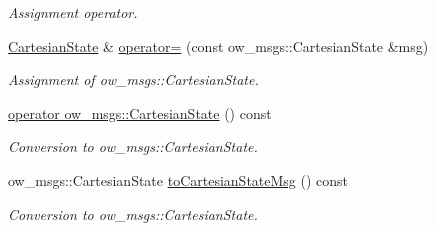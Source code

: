 \begin{DoxyCompactItemize}
\begin{DoxyCompactList}\small\item\em Assignment operator. \end{DoxyCompactList}\item 
\hyperlink{classow__core_1_1CartesianState}{Cartesian\+State} \& \hyperlink{classow__core_1_1CartesianState_a22b225fef674b6cd271f876999c62ab0}{operator=} (const ow\+\_\+msgs\+::\+Cartesian\+State \&msg)\hypertarget{classow__core_1_1CartesianState_a22b225fef674b6cd271f876999c62ab0}{}\label{classow__core_1_1CartesianState_a22b225fef674b6cd271f876999c62ab0}

\begin{DoxyCompactList}\small\item\em Assignment of ow\+\_\+msgs\+::\+Cartesian\+State. \end{DoxyCompactList}\item 
\hyperlink{classow__core_1_1CartesianState_ab0f5033bd10e8a411668f1aec838a158}{operator ow\+\_\+msgs\+::\+Cartesian\+State} () const \hypertarget{classow__core_1_1CartesianState_ab0f5033bd10e8a411668f1aec838a158}{}\label{classow__core_1_1CartesianState_ab0f5033bd10e8a411668f1aec838a158}

\begin{DoxyCompactList}\small\item\em Conversion to ow\+\_\+msgs\+::\+Cartesian\+State. \end{DoxyCompactList}\item 
ow\+\_\+msgs\+::\+Cartesian\+State \hyperlink{classow__core_1_1CartesianState_aec96a9333ff1180a95db8df0d7b0d820}{to\+Cartesian\+State\+Msg} () const \hypertarget{classow__core_1_1CartesianState_aec96a9333ff1180a95db8df0d7b0d820}{}\label{classow__core_1_1CartesianState_aec96a9333ff1180a95db8df0d7b0d820}

\begin{DoxyCompactList}\small\item\em Conversion to ow\+\_\+msgs\+::\+Cartesian\+State. \end{DoxyCompactList}\end{DoxyCompactItemize}
